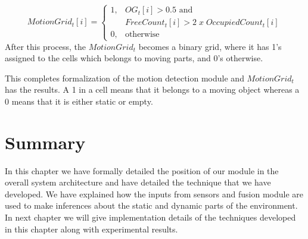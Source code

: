 \begin{equation}
MotionGrid_t[i] = \begin{cases} 1, & \mbox{$OG_t[i] > 0.5$ and} \\ & \mbox {$FreeCount_t[i]>2\;  x \; OccupiedCount_t[i]$} \\
                                0, & \mbox{otherwise}\end{cases}
\end{equation}
After this process, the $MotionGrid_t$ becomes a binary grid, where it has 1's assigned to the cells which belongs to moving parts, and 0's otherwise.

This completes formalization of the motion detection module and $MotionGrid_t$ has the results. A 1 in a cell means that it belongs to a moving object whereas a 0 means that it is either static or empty.





\section{Summary}
In this chapter we have formally detailed the position of our module in the overall system architecture and have detailed the technique that we have developed. We have explained how the inputs from sensors and fusion module are used to make inferences about the static and dynamic parts of the environment. In next chapter we will give implementation details of the techniques developed in this chapter along with experimental results.

